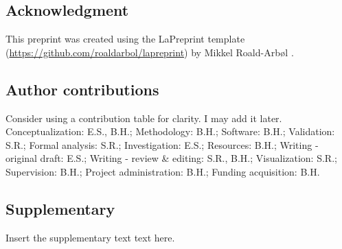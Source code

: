 \subsection{Acknowledgment}
This preprint was created using the LaPreprint template (\url{https://github.com/roaldarbol/lapreprint}) by Mikkel Roald-Arb\o l \textsuperscript{}.

\subsection{Author contributions}
Consider using a contribution table for clarity. I may add it later.
Conceptualization: E.S., B.H.; Methodology: B.H.; Software: B.H.; Validation: S.R.; Formal analysis: S.R.; Investigation: E.S.; Resources: B.H.; Writing - original draft: E.S.; Writing - review \& editing: S.R., B.H.; Visualization: S.R.; Supervision: B.H.; Project administration: B.H.; Funding acquisition: B.H.

\subsection{Supplementary}
Insert the supplementary text text here.